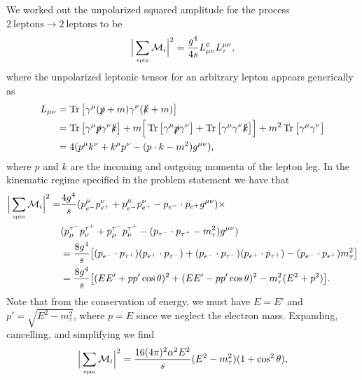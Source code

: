 We worked out the unpolarized squared amplitude for the process $2 ~ \mbox{leptons} \rightarrow 2~\mbox{leptons}$ to be
\begin{eqnarray}
    \label{eq:lep-ampsq}
    \Big| \sum_{\mbox{\tiny spin}} \mathcal{M}_{i} \Big|^2 = \frac{g^{4}}{4s} L_{\mu\nu}^{e} L_{\tau}^{\mu\nu}
,\end{eqnarray}
where the unpolarized leptonic tensor for an arbitrary lepton appears generically as 
\begin{align}
    \label{eq:lep-tensor}
    L_{\mu\nu} &= \Tr\big[ \gamma^{\mu}(\slashed{p} + m)\gamma^{\nu}(\slashed{k} + m) \big] \notag \\
               &= \Tr\big[ \gamma^{\mu}\slashed{p}\gamma^{\nu}\slashed{k} \big] + m \Big[ \Tr\big[ \gamma^{\mu}\slashed{p}\gamma^{\nu} \big] + \Tr\big[ \gamma^{\mu}\gamma^{\nu}\slashed{k} \big] \Big] + m^2 \Tr\big[ \gamma^{\mu}\gamma^{\nu} \big] \notag \\
               &= 4( p^{\mu}k^{\nu} + k^{\mu}p^{\nu} - (p \cdot k - m^2) g^{\mu\nu} )
,\end{align}
where $p$ and $k$ are the incoming and outgoing momenta of the lepton leg.
In the kinematic regime specified in the problem statement we have that
\begin{align}
    \label{eq:lep-ampsq-2}
    \Big| \sum_{\mbox{\tiny spin}} \mathcal{M}_{i} \Big|^2 =& \frac{4g^{4}}{s} ( p_{e^{-}}^{\mu} p_{e^{+}}^{\nu} + p_{e^{-}}^{\mu} p_{e^{+}}^{\nu} - p_{e^{-}} \cdot p_{e^{+}} g^{\mu\nu} ) \times \notag \\
    &( p^{\tau^{-}}_{\mu} p^{\tau^{+}}_{\nu} + p^{\tau^{-}}_{\mu} p^{\tau^{+}}_{\nu} - (p_{\tau^{-}} \cdot p_{\tau^{+}} - m_{\tau}^2) g^{\mu\nu} ) \notag \\
    &= \frac{8g^{4}}{s} \big[ (p_{e^{-}} \cdot p_{\tau^{+}})(p_{e^{+}} \cdot p_{\tau^{-}}) + (p_{e^{-}} \cdot p_{\tau^{-}})(p_{e^{+}} \cdot p_{\tau^{+}}) - ( p_{e^{-}} \cdot p_{e^{+}} ) m_{\tau}^2 \big] \notag \\
    &= \frac{8g^{4}}{s} \big[ ( E E' + p p' \cos{\theta} )^2 + ( E E' - p p'\cos{\theta} )^2  - m_{\tau}^2( E^2 + p^2 ) \big]
.\end{align}
Note that from the conservation of energy, we must have $E = E'$ and $p' = \sqrt{E^2 -  m_{\tau}^2}$, where $p = E$ since we neglect the electron mass.
Expanding, cancelling, and simplifying we find
\begin{eqnarray}
    \label{eq:lep-ampsq-3}
    \Big| \sum_{\mbox{\tiny spin}} \mathcal{M}_{i} \Big|^2 = \frac{16 (4\pi)^2 \alpha^2 E^2}{s} (E^2 - m_{\tau}^2) (1 + \cos^2{\theta})
,\end{eqnarray}
